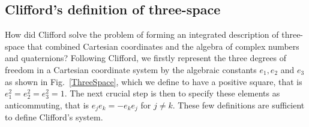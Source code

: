 \documentclass[prb,preprint]{revtex4}
\begin{document}
\subsection{Clifford's definition of three-space}

How did Clifford solve the problem of forming an integrated description of three-space that combined Cartesian coordinates and the algebra of complex numbers and quaternions? 
Following Clifford, we firstly represent the three degrees of freedom in a Cartesian coordinate system by the algebraic constants $ e_1, e_2 $ and $ e_3 $ as shown in Fig.~\ref{ThreeSpace}, which we define to have a positive square, that is $ e_1^2 = e_2^2 = e_3^2 = 1$. The next crucial step is then to specify these elements as anticommuting, that is $ e_j e_k = - e_k e_j $ for $ j \ne k $.  These few definitions are sufficient to define Clifford's system. 
\end{document}
